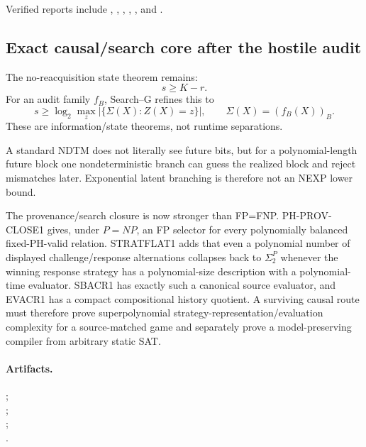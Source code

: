 \documentclass[11pt]{article}
\begin{document}
Verified reports include
,
,
,
,
, and
.

\subsection{Exact causal/search core after the hostile audit}

The no-reacquisition state theorem remains:
\[
\boxed{s\ge K-r.}
\]
For an audit family \(f_B\), Search--G refines this to
\[
\boxed{
s\ge
\log_2\max_z
\left|\{\Sigma(X):Z(X)=z\}\right|,
\qquad
\Sigma(X)=(f_B(X))_B.
}
\]
These are information/state theorems, not runtime separations.

A standard NDTM does not literally see future bits, but for a polynomial-length future block one
nondeterministic branch can guess the realized block and reject mismatches later. Exponential latent
branching is therefore not an NEXP lower bound.

The provenance/search closure is now stronger than FP=FNP. PH-PROV-CLOSE1 gives, under \(P=NP\),
an FP selector for every polynomially balanced fixed-PH-valid relation. STRATFLAT1 adds that even a
polynomial number of displayed challenge/response alternations collapses back to \(\Sigma_2^P\)
whenever the winning response strategy has a polynomial-size description with a polynomial-time
evaluator. SBACR1 has exactly such a canonical source evaluator, and EVACR1 has a compact
compositional history quotient. A surviving causal route must therefore prove superpolynomial
strategy-representation/evaluation complexity for a source-matched game and separately prove a
model-preserving compiler from arbitrary static SAT.

\paragraph{Artifacts.}
;\\
;\\
;\\
.
\end{document}
